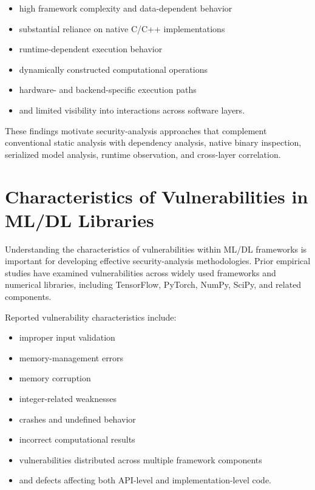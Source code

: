 \documentclass[
  12pt,
  letterpaper,
  oneside]{report}
\providecommand{\tightlist}{%
  \setlength{\itemsep}{0pt}\setlength{\parskip}{0pt}}
\begin{document}
\begin{itemize}
\tightlist
\item
  high framework complexity and data-dependent behavior
\item
  substantial reliance on native C/C++ implementations
\item
  runtime-dependent execution behavior
\item
  dynamically constructed computational operations
\item
  hardware- and backend-specific execution paths
\item
  and limited visibility into interactions across software layers.
\end{itemize}

These findings motivate security-analysis approaches that complement
conventional static analysis with dependency analysis, native binary
inspection, serialized model analysis, runtime observation, and
cross-layer correlation.

\section{Characteristics of Vulnerabilities in ML/DL Libraries}\label{83-characteristics-of-vulnerabilities-in-mldl-libraries}

Understanding the characteristics of vulnerabilities within ML/DL
frameworks is important for developing effective security-analysis
methodologies. Prior empirical studies have examined vulnerabilities
across widely used frameworks and numerical libraries, including
TensorFlow, PyTorch, NumPy, SciPy, and related components.
\cite{harzevili2023characterizing,lai2025security,zhou2025unraveling}

Reported vulnerability characteristics include:

\begin{itemize}
\tightlist
\item
  improper input validation
\item
  memory-management errors
\item
  memory corruption
\item
  integer-related weaknesses
\item
  crashes and undefined behavior
\item
  incorrect computational results
\item
  vulnerabilities distributed across multiple framework components
\item
  and defects affecting both API-level and implementation-level code.
\end{itemize}
\end{document}
